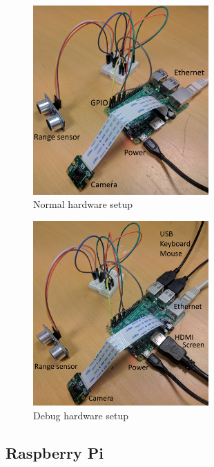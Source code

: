 \begin{figure}[H]
  \centering
  \includegraphics[width=0.6\textwidth]{fig/setup_normal}
  \caption{Normal hardware setup}
  \label{fig:setup_n}
\end{figure}
\begin{figure}[H]
  \centering
  \includegraphics[width=0.6\textwidth]{fig/setup_debug}
  \caption{Debug hardware setup}
  \label{fig:setup_d}
\end{figure}

\subsection{Raspberry Pi}

